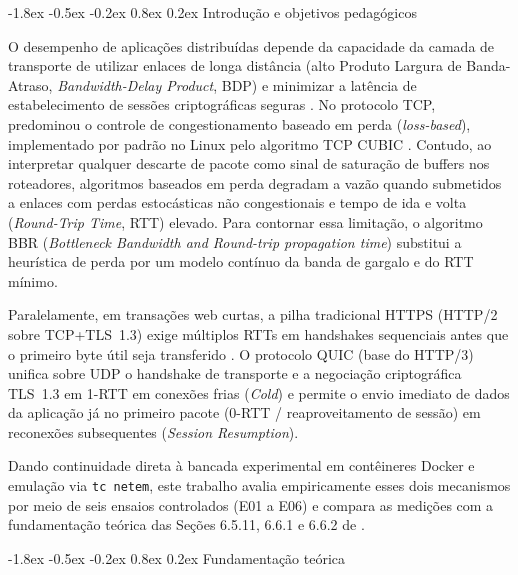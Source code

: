 \documentclass[12pt]{article}
\makeatletter
\renewcommand\section{\@startsection{section}{1}{\z@}%
                       {-1.8ex \@plus -0.5ex \@minus -0.2ex}%
                       {0.8ex \@plus 0.2ex}%
                       {\reset@font\large\bfseries}}
\makeatother
\begin{document}
\section{Introdução e objetivos pedagógicos}

O desempenho de aplicações distribuídas depende da capacidade da camada de transporte de utilizar enlaces de longa distância (alto Produto Largura de Banda-Atraso, \textit{Bandwidth-Delay Product}, BDP) e minimizar a latência de estabelecimento de sessões criptográficas seguras \cite{tanenbaum2021}. No protocolo TCP, predominou o controle de congestionamento baseado em perda (\textit{loss-based}), implementado por padrão no Linux pelo algoritmo TCP CUBIC \cite{ha2008cubic}. Contudo, ao interpretar qualquer descarte de pacote como sinal de saturação de buffers nos roteadores, algoritmos baseados em perda degradam a vazão quando submetidos a enlaces com perdas estocásticas não congestionais e tempo de ida e volta (\textit{Round-Trip Time}, RTT) elevado. Para contornar essa limitação, o algoritmo BBR (\textit{Bottleneck Bandwidth and Round-trip propagation time}) \cite{cardwell2017bbr} substitui a heurística de perda por um modelo contínuo da banda de gargalo e do RTT mínimo.

Paralelamente, em transações web curtas, a pilha tradicional HTTPS (HTTP/2 sobre TCP+TLS~1.3) exige múltiplos RTTs em handshakes sequenciais antes que o primeiro byte útil seja transferido \cite{rfc7540,rfc8446}. O protocolo QUIC (base do HTTP/3) \cite{rfc9000,rfc9114} unifica sobre UDP o handshake de transporte e a negociação criptográfica TLS~1.3 em 1-RTT em conexões frias (\textit{Cold}) e permite o envio imediato de dados da aplicação já no primeiro pacote (0-RTT / reaproveitamento de sessão) em reconexões subsequentes (\textit{Session Resumption}).

Dando continuidade direta à bancada experimental em contêineres Docker e emulação via \texttt{tc netem}, este trabalho avalia empiricamente esses dois mecanismos por meio de seis ensaios controlados (E01 a E06) e compara as medições com a fundamentação teórica das Seções 6.5.11, 6.6.1 e 6.6.2 de \cite{tanenbaum2021}.

\section{Fundamentação teórica}
\end{document}
